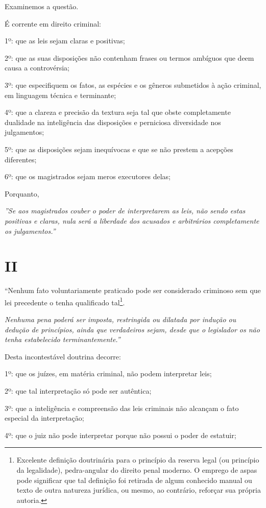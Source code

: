 Examinemos a questão.

É corrente em direito criminal:

1º: que as leis sejam claras e positivas;

2º: que as suas disposições não contenham frases ou termos ambíguos que
deem causa a controvérsia;

3º: que especifiquem os fatos, as espécies e os gêneros submetidos à
ação criminal, em linguagem técnica e terminante;

4º: que a clareza e precisão da textura seja tal que obste completamente
dualidade na inteligência das disposições e perniciosa diversidade nos
julgamentos;

5º: que as disposições sejam inequívocas e que se não prestem a acepções
diferentes;

6º: que os magistrados sejam meros executores delas;

Porquanto,

\emph{''Se aos magistrados couber o poder de interpretarem as leis, não
sendo estas positivas e claras, nula será a liberdade dos acusados e
arbitrários completamente os julgamentos.''}

\section{II}

``Nenhum fato voluntariamente praticado pode ser considerado criminoso
sem que lei precedente o tenha qualificado tal\footnote{Excelente
  definição doutrinária para o princípio da reserva legal (ou princípio
  da legalidade), pedra-angular do direito penal moderno. O emprego de
  aspas pode significar que tal definição foi retirada de algum
  conhecido manual ou texto de outra natureza jurídica, ou mesmo, ao
  contrário, reforçar sua própria autoria.}.

\emph{Nenhuma pena poderá ser imposta, restringida ou dilatada por
indução ou dedução de princípios, ainda que verdadeiros sejam, desde que
o legislador os não tenha estabelecido terminantemente.''}

Desta incontestável doutrina decorre:

1º: que os juízes, em matéria criminal, não podem interpretar leis;

2º: que tal interpretação só pode ser autêntica;

3º: que a inteligência e compreensão das leis criminais não alcançam o
fato especial da interpretação;

4º: que o juiz não pode interpretar porque não possui o poder de
estatuir;

